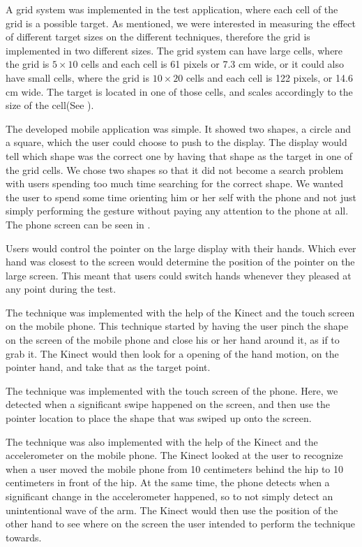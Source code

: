 A grid system was implemented in the test application, where each cell of the grid is a possible target. 
As mentioned, we were interested in measuring the effect of different target sizes on the different techniques, therefore the grid is implemented in two different sizes. 
The grid system can have large cells, where the grid is $5 \times 10$ cells and each cell is 61 pixels or 7.3 cm wide, or it could also have small cells, where the grid is $10 \times 20$ cells and each cell is 122 pixels, or 14.6 cm wide. 
The target is located in one of those cells, and scales accordingly to the size of the cell(See ).

The developed mobile application was simple. It showed two shapes, a circle and a square, which the user could choose to push to the display. The display would tell which shape was the correct one by having that shape as the target in one of the grid cells. We chose two shapes so that it did not become a search problem with users spending too much time searching for the correct shape. We wanted the user to spend some time orienting him or her self with the phone and not just simply performing the gesture without paying any attention to the phone at all. The phone screen can be seen in .

Users would control the pointer on the large display with their hands. 
Which ever hand was closest to the screen would determine the position of the pointer on the large screen. 
This meant that users could switch hands whenever they pleased at any point during the test. 

The \pinch technique was implemented with the help of the Kinect and the touch screen on the mobile phone. 
This technique started by having the user pinch the shape on the screen of the mobile phone and close his or her hand around it, as if to grab it. 
The Kinect would then look for a opening of the hand motion, on the pointer hand, and take that as the target point.

The \swipe technique was implemented with the touch screen of the phone. 
Here, we detected when a significant swipe happened on the screen, and then use the pointer location to place the shape that was swiped up onto the screen. 

The \throw technique was also implemented with the help of the Kinect and the accelerometer on the mobile phone. 
The Kinect looked at the user to recognize when a user moved the mobile phone from 10 centimeters behind the hip to 10 centimeters in front of the hip. 
At the same time, the phone detects when a significant change in the accelerometer happened, so to not simply detect an unintentional wave of the arm. 
The Kinect would then use the position of the other hand to see where on the screen the user intended to perform the \throw technique towards. 

